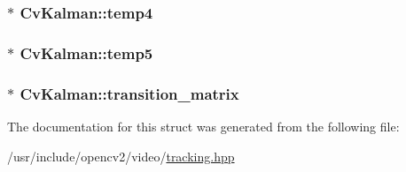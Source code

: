\hypertarget{structCvKalman_ae65fae2a986ffbfdeda3c0d30fd1aefc}{
\subsubsection[{temp4}]{$\ast$ Cv\-Kalman\-::temp4}}\label{structCvKalman_ae65fae2a986ffbfdeda3c0d30fd1aefc}
\hypertarget{structCvKalman_a094d6fae600bbbe2cc7b85ab4cfffa9e}{
\subsubsection[{temp5}]{$\ast$ Cv\-Kalman\-::temp5}}\label{structCvKalman_a094d6fae600bbbe2cc7b85ab4cfffa9e}
\hypertarget{structCvKalman_a9bc599a7f1197f20cbe93ed6ea3611ac}{
\subsubsection[{transition\-\_\-matrix}]{$\ast$ Cv\-Kalman\-::transition\-\_\-matrix}}\label{structCvKalman_a9bc599a7f1197f20cbe93ed6ea3611ac}


The documentation for this struct was generated from the following file\-:\begin{DoxyCompactItemize}
\item 
/usr/include/opencv2/video/\hyperlink{tracking_8hpp}{tracking.\-hpp}\end{DoxyCompactItemize}
